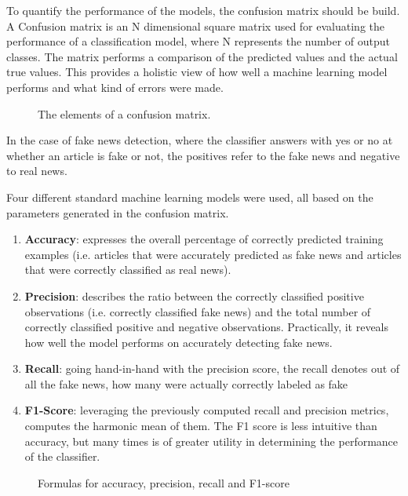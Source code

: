 To quantify the performance of the models, the confusion matrix should be build. A Confusion matrix is an N dimensional square matrix used for evaluating the performance of a classification model, where N represents the number of output classes. The matrix performs a comparison of the predicted values and the actual true values. This provides a holistic view of how well a machine learning model performs and what kind of errors were made. 

\begin{figure}[H]
  \centering
  \caption{The elements of a confusion matrix.}
\end{figure}

In the case of fake news detection, where the classifier answers with yes or no at whether an article is fake or not, the positives refer to the fake news and negative to real news.

Four different standard machine learning models were used, all based on the parameters generated in the confusion matrix.
\begin{enumerate}
  \item \textbf{Accuracy}: expresses the overall percentage of correctly predicted training examples (i.e. articles that were accurately predicted as fake news and articles that were correctly classified as real news).
  \item \textbf{Precision}: describes the ratio between the correctly classified positive observations (i.e. correctly classified fake news) and the total number of correctly classified positive and negative observations. Practically, it reveals how well the model performs on accurately detecting fake news. 
  \item \textbf{Recall}: going hand-in-hand with the precision score, the recall denotes out of all the fake news, how many were actually correctly labeled as fake
  \item \textbf{F1-Score}: leveraging the previously computed recall and precision metrics, computes the harmonic mean of them. The F1 score is less intuitive than accuracy, but many times is of greater utility in determining the performance of the classifier.
\end{enumerate}

\begin{figure}[H]
  \centering
  \caption{Formulas for accuracy, precision, recall and F1-score}
\end{figure}

